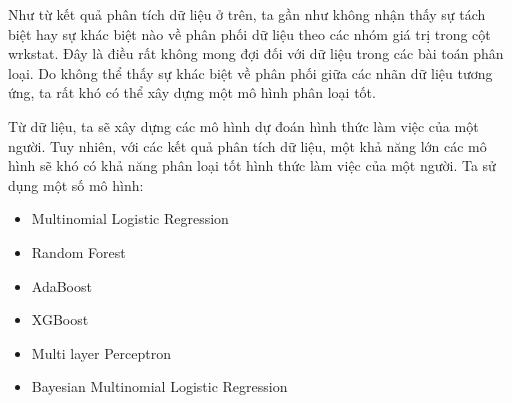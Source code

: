 Như từ kết quả phân tích dữ liệu ở trên, ta gần như không nhận thấy sự tách biệt hay sự khác biệt nào về phân phối dữ liệu theo các nhóm giá trị trong cột wrkstat.
Đây là điều rất không mong đợi đối với dữ liệu trong các bài toán phân loại.
Do không thể thấy sự khác biệt về phân phối giữa các nhãn dữ liệu tương ứng, ta rất khó có thể xây dựng một mô hình phân loại tốt.

Từ dữ liệu, ta sẽ xây dựng các mô hình dự đoán hình thức làm việc của một người.
Tuy nhiên, với các kết quả phân tích dữ liệu, một khả năng lớn các mô hình sẽ khó có khả năng phân loại tốt hình thức làm việc của một người.
Ta sử dụng một số mô hình:

\begin{itemize}
    \item Multinomial Logistic Regression
    \item Random Forest
    \item AdaBoost
    \item XGBoost
    \item Multi layer Perceptron
    \item Bayesian Multinomial Logistic Regression
\end{itemize}

